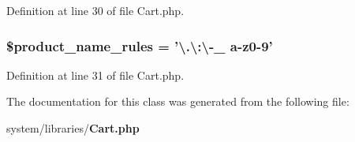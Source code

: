Definition at line 30 of file Cart.\-php.

\subsubsection[{\$product\-\_\-name\-\_\-rules}]{\setlength{\rightskip}{0pt plus 5cm}\$product\-\_\-name\-\_\-rules = '\textbackslash{}.\textbackslash{}\-:\textbackslash{}-\/{\bf \-\_\-} {\bf a}-\/z0-\/9'}\label{class_c_i___cart_afdc2e791be5e676e94580a0d9ed63ebf}


Definition at line 31 of file Cart.\-php.



The documentation for this class was generated from the following file\-:\begin{DoxyCompactItemize}
\item 
system/libraries/{\bf Cart.\-php}\end{DoxyCompactItemize}
